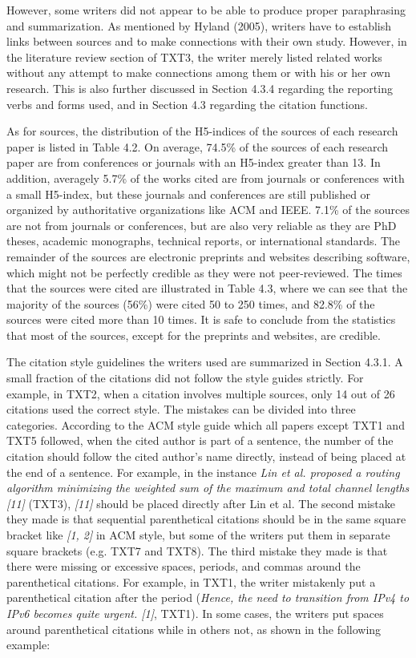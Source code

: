 However, some writers did not appear to be able to produce proper paraphrasing and summarization. As mentioned by Hyland (2005), writers have to establish links between sources and to make connections with their own study. However, in the literature review section of TXT3, the writer merely listed related works without any attempt to make connections among them or with his or her own research. This is also further discussed in Section 4.3.4 regarding the reporting verbs and forms used, and in Section 4.3 regarding the citation functions.

As for sources, the distribution of the H5-indices of the sources of each research paper is listed in Table 4.2. On average, 74.5\% of the sources of each research paper are from conferences or journals with an H5-index greater than 13. In addition, averagely 5.7\% of the works cited are from journals or conferences with a small H5-index, but these journals and conferences are still published or organized by authoritative organizations like ACM and IEEE. 7.1\% of the sources are not from journals or conferences, but are also very reliable as they are PhD theses, academic monographs, technical reports, or international standards. The remainder of the sources are electronic preprints and websites describing software, which might not be perfectly credible as they were not peer-reviewed. The times that the sources were cited are illustrated in Table 4.3, where we can see that the majority of the sources (56\%) were cited 50 to 250 times, and 82.8\% of the sources were cited more than 10 times. It is safe to conclude from the statistics that most of the sources, except for the preprints and websites, are credible.



The citation style guidelines the writers used are summarized in Section 4.3.1. A small fraction of the citations did not follow the style guides strictly. For example, in TXT2, when a citation involves multiple sources, only 14 out of 26 citations used the correct style. The mistakes can be divided into three categories. According to the ACM style guide which all papers except TXT1 and TXT5 followed, when the cited author is part of a sentence, the number of the citation should follow the cited author’s name directly, instead of being placed at the end of a sentence. For example, in the instance \textit{Lin et al. proposed a routing algorithm minimizing the weighted sum of the maximum and total channel lengths [11]} (TXT3), \textit{[11]} should be placed directly after Lin et al. The second mistake they made is that sequential parenthetical citations should be in the same square bracket like \textit{[1, 2]} in ACM style, but some of the writers put them in separate square brackets (e.g. TXT7 and TXT8). The third mistake they made is that there were missing or excessive spaces, periods, and commas around the parenthetical citations. For example, in TXT1, the writer mistakenly put a parenthetical citation after the period (\textit{Hence, the need to transition from IPv4 to IPv6 becomes quite urgent. [1]}, TXT1). In some cases, the writers put spaces around parenthetical citations while in others not, as shown in the following example:

